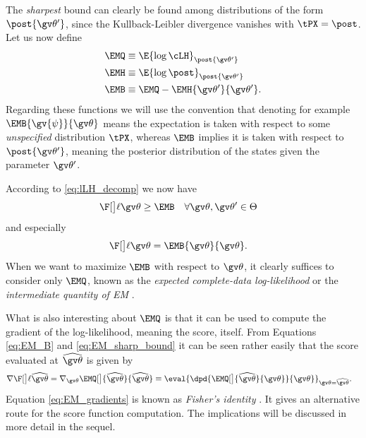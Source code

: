The \emph{sharpest} bound can clearly be found among
distributions of the form $\post{\Th'}$, since the Kullback-Leibler divergence 
vanishes with $\tPX= \post$.
Let us now define
\begin{align}
	\EMQ &\equiv \E{\log\cLH}_{\post{\Th'}} \label{eq:EM_Q}\\
	\EMH &\equiv \E{\log\post}_{\post{\Th'}} \label{eq:EM_H}\\
	\EMB &\equiv \EMQ - \EMH{\Th'}{\Th'} \label{eq:EM_B}.
\end{align}
Regarding these functions we will use the convention that denoting for example $\EMB{\gv{\psi}}{\Th}$ means the
expectation is taken with respect to some \emph{unspecified} distribution $\tPX$, whereas $\EMB$ implies
it is taken with respect to $\post{\Th'}$, meaning the posterior distribution of the states given the parameter $\Th'$.


According to \eqref{eq:lLH_decomp} we now have
\begin{align}
	\lLH & \geq \EMB \quad \forall \Th,\Th' \in \Theta
	\label{eq:EM_LB}
\end{align}
and especially
\begin{align}
	\lLH & = \EMB{\Th}{\Th}.
	\label{eq:EM_sharp_bound}
\end{align}
When we want to maximize $\EMB$ with respect to $\Th$,
it clearly suffices to consider
only $\EMQ$, known as the \emph{expected complete-data log-likelihood}
or the \emph{intermediate quantity of EM} \parencite{Cappe2005,Bishop2006}.

What is also interesting about $\EMQ$ is that it can be used to compute the gradient of the log-likelihood, meaning
the score, itself. From Equations \eqref{eq:EM_B}
and \eqref{eq:EM_sharp_bound} it can be seen rather easily that  
the score evaluated at $\widehat{\Th}$ is given by
\begin{align}
		\score[\widehat\Th]&=
		\nabla_{\Th}\EMQ[\big]{\widehat\Th}{\widehat\Th}
		\equiv\eval{\dpd{ \EMQ[\big]{\widehat\Th}{\Th}}{\Th}}_{\Th=\widehat\Th} \label{eq:EM_gradients}.
\end{align} 
Equation \eqref{eq:EM_gradients} is known as \emph{Fisher's identity} \parencite{Cappe2005, Segal1989}. It gives
an alternative route for the score function computation.
The implications will be discussed in more detail in the sequel.

